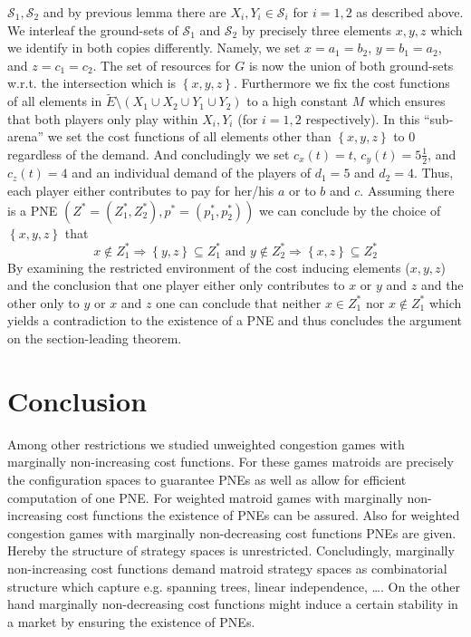\documentclass{scrartcl}
\theoremstyle{nonumberplain}
\newcommand{\tupel}[1]{\left(#1\right)}
\newcommand{\set}[1]{\left\{#1\right\}}
\begin{document}
$\mathcal{S}_{1},\mathcal{S}_{2}$ and by previous lemma there are
$X_{i}, Y_{i}\in\mathcal{S}_{i}$ for $i = 1,2$ as described above. We interleaf
the ground-sets of $\mathcal{S}_{1}$ and $\mathcal{S}_{2}$ by precisely three
elements $x,y,z$ which we identify in both copies differently. Namely, we set
$x = a_{1} = b_{2}$, $y = b_{1} = a_{2}$, and $z = c_{1} = c_{2}$. The set of
resources for $G$ is now the union of both ground-sets w.r.t. the intersection
which is $\set{x,y,z}$. Furthermore we fix the cost functions of all elements
in $\tilde{E}\setminus(X_{1}\cup X_{2}\cup Y_{1}\cup Y_{2})$ to a high constant
$M$ which ensures that both players only play within $X_{i}, Y_{i}$ (for
$i = 1,2$ respectively). In this \enquote{sub-arena} we set the cost functions
of all elements other than $\set{x,y,z}$ to $0$ regardless of the demand. And
concludingly we set $c_{x}(t) = t$, $c_{y}(t) = 5\frac{1}{2}$, and
$c_{z}(t) = 4$ and an individual demand of the players of $d_{1} = 5$ and
$d_{2} = 4$. Thus, each player either contributes to pay for her/his $a$ or
to $b$ and $c$. Assuming there is a PNE
$\tupel{Z^{\ast} = \tupel{Z_{1}^{\ast}, Z_{2}^{\ast}},
p^{\ast} = \tupel{p_{1}^{\ast}, p_{2}^{\ast}}}$ we can conclude by the choice
of $\set{x,y,z}$ that
\begin{equation*}
  x\notin Z_{1}^{\ast}\Rightarrow \set{y,z}\subseteq Z_{1}^{\ast} \text{ and }
  y\notin Z_{2}^{\ast}\Rightarrow \set{x,z}\subseteq Z_{2}^{\ast}
\end{equation*}
By examining the restricted environment of the cost inducing elements ($x,y,z$)
and the conclusion that one player either only contributes to $x$ or $y$ and
$z$ and the other only to $y$ or $x$ and $z$ one can conclude that neither
$x\in Z_{1}^{\ast}$ nor $x\notin Z_{1}^{\ast}$ which yields a contradiction to
the existence of a PNE and thus concludes the argument on the section-leading
theorem.

\section{Conclusion}
Among other restrictions we studied unweighted congestion games with marginally
non-increasing cost functions. For these games matroids are precisely the
configuration spaces to guarantee PNEs as well as allow for efficient
computation of one PNE. For weighted matroid games with marginally
non-increasing cost functions the existence of PNEs can be assured. Also for
weighted congestion games with marginally non-decreasing cost functions PNEs
are given. Hereby the structure of strategy spaces is unrestricted.
Concludingly, marginally non-increasing cost functions demand matroid strategy
spaces as combinatorial structure which capture e.g. spanning trees, linear
independence, \dots. On the other hand marginally non-decreasing cost functions
might induce a certain stability in a market by ensuring the existence of PNEs.

\printbibliography

\todos
\end{document}
